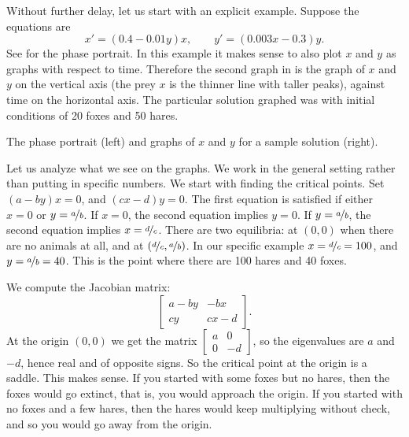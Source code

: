 Without further delay, let us start with an explicit example.  Suppose the
equations are 
\begin{equation*}
x' = (0.4-0.01y)x, \qquad y' = (0.003x-0.3)y .
\end{equation*}
See  for the phase portrait.  In this example
it makes sense to also plot $x$ and $y$ as graphs with respect to time.
Therefore the second graph in 
 is the graph of $x$ and $y$ on the vertical
axis (the prey $x$ is the thinner line with taller peaks), against time
on the horizontal axis.  The particular solution graphed was with initial
conditions of 20 foxes and 50 hares.
\begin{myfig}
\capstart
\caption{The phase portrait (left) and graphs of $x$ and $y$ for
a sample solution (right). \label{fig:nlin-pred-prey}}
\end{myfig}

Let us analyze what we see on the graphs.  We work in the general
setting rather than putting in specific numbers.  We start with finding
the critical points.  Set $(a-by)x = 0$, and $(cx-d)y = 0$.
The first equation is satisfied if either $x=0$ or $y=\nicefrac{a}{b}$.  If $x=0$, the
second equation implies $y=0$.  If $y= \nicefrac{a}{b}$, the second equation implies
$x=\nicefrac{d}{c}$.
There are two equilibria: at $(0,0)$ when there are no animals at all, and at
$(\nicefrac{d}{c},\nicefrac{a}{b})$.  
In our specific example $x = \nicefrac{d}{c} = 100$, and $y = \nicefrac{a}{b} = 40$.
This is the point where there are 100 hares and 40 foxes.

We compute the Jacobian matrix:
\begin{equation*}
\begin{bmatrix}
a-by & -bx \\
cy & cx-d
\end{bmatrix} .
\end{equation*}
At the origin $(0,0)$ we get the matrix
$\left[ \begin{smallmatrix}
a & 0 \\
0 & -d
\end{smallmatrix} \right]$, so the eigenvalues are $a$ and $-d$, hence real
and of opposite signs.  So the critical point at the origin is a saddle.
This makes sense.  If you started with some foxes but no hares, then the
foxes would go extinct, that is, you would approach the origin.  If you
started with no foxes and a few hares, then the hares would keep multiplying
without check, and so you would go away from the origin.

